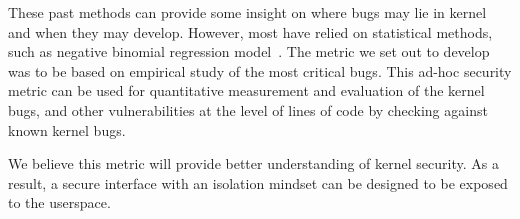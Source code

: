 These past methods can provide some insight on where bugs may lie in kernel and when
they may develop. However, most have relied on statistical methods, such as
negative binomial regression model~\cite{Bug-Location}. The metric we set out to
develop was to be based on empirical study of
the most critical bugs. This ad-hoc security metric can be used for
quantitative measurement and evaluation of the kernel bugs,
and other vulnerabilities at the level of lines of code by checking against
known kernel bugs.

We believe this metric will provide better understanding of kernel security.
As a result, a secure interface with an isolation mindset can be designed
to be exposed to the userspace.







